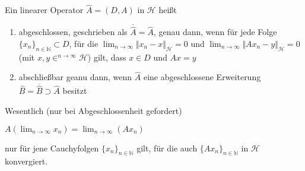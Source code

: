 \begin{Def}
    Ein linearer Operator $\hat{A} = (D,A)$ in $\mathcal{H}$ heißt
    \begin{enumerate}[label=(\alph*)]
        \item abgeschlossen, geschrieben als $\overline{\hat{A}} = \hat{A}$, genau dann, wenn für jede Folge
                $\{x_n\}_{n \in \mathbb{N}} \subset D$, für die $\lim_{n \rightarrow \infty} {\Vert x_n -x \Vert}_\mathcal{H} = 0$ und $\lim_{n \rightarrow \infty} {\Vert Ax_n -y \Vert}_\mathcal{H} = 0$
                (mit $x,y \in^{n \rightarrow \infty} \mathcal{H}$) gilt, dass $x \in D$ und $Ax = y$
        \item abschließbar geanu dann, wenn $\hat{A}$ eine abgeschlossene Erweiterung 
                $\hat{B} = \overline{\hat{B}} \supset \hat{A}$ besitzt
    \end{enumerate}
\end{Def}

\begin{Bem}
    Wesentlich (nur bei Abgeschlossenheit gefordert)

    $A( \lim_{n \rightarrow \infty} x_n) = \lim_{n \rightarrow \infty} (A x_n)$

    nur für jene Cauchyfolgen $\{ x_n\}_{n \in \mathbb{N}}$ gilt, für die auch 
    $\{ A x_n\}_{n \in \mathbb{N}}$ in $\mathcal{H}$ konvergiert.
\end{Bem}

